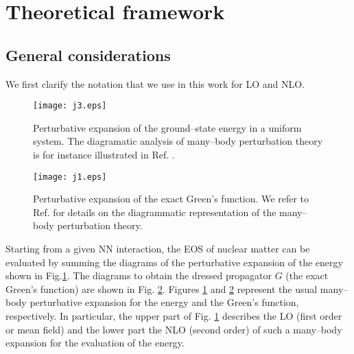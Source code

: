 \documentclass[aps,11pt,prc,preprint,superscriptaddress,nofootinbib]{revtex4}
\begin{document}
\section{Theoretical framework}

\subsection{General considerations}

We first clarify the notation that we use in this work for LO and NLO.

\begin{figure}[h]
\texttt{[image: j3.eps]}
\caption{Perturbative expansion of the ground--state energy in a uniform system. The diagramatic analysis of many--body perturbation theory is for instance illustrated in Ref. \cite{FW}.}
\label{j3}
\end{figure}
\begin{figure}[h]
\texttt{[image: j1.eps]}
\caption{Perturbative expansion of the exact Green's function. We refer to Ref. \cite{FW} for details on the 
diagrammatic representation of the many--body perturbation theory.}
\label{j1}
\end{figure}
Starting from a given NN interaction, the EOS of nuclear matter can be evaluated by summing 
the diagrams of the perturbative expansion of the energy shown in Fig.\ref{j3}. 
The 
diagrams to obtain the dressed propagator $G$ (the exact Green's function) are shown in Fig. \ref{j1}. 
Figures \ref{j3} and \ref{j1} represent the usual many--body perturbative expansion for the energy 
and the Green's function, respectively. In particular, the upper part of Fig. \ref{j3} describes the LO (first order or mean field) and the lower part the NLO (second order) of such a many--body expansion for the evaluation of the energy.
\end{document}

